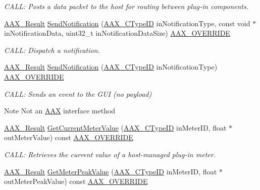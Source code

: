 \begin{DoxyCompactItemize}
\begin{DoxyCompactList}\small\item\em C\+A\+LL\+: Posts a data packet to the host for routing between plug-\/in components. \end{DoxyCompactList}\item 
\mbox{\hyperlink{a00392_a4d8f69a697df7f70c3a8e9b8ee130d2f}{A\+A\+X\+\_\+\+Result}} \mbox{\hyperlink{a01905_aea3105179d5ecba7bb73f5ca1c1cde3e}{Send\+Notification}} (\mbox{\hyperlink{a00392_ac678f9c1fbcc26315d209f71a147a175}{A\+A\+X\+\_\+\+C\+Type\+ID}} in\+Notification\+Type, const void $\ast$in\+Notification\+Data, uint32\+\_\+t in\+Notification\+Data\+Size) \mbox{\hyperlink{a00392_ac2f24a5172689ae684344abdcce55463}{A\+A\+X\+\_\+\+O\+V\+E\+R\+R\+I\+DE}}
\begin{DoxyCompactList}\small\item\em C\+A\+LL\+: Dispatch a notification. \end{DoxyCompactList}\item 
\mbox{\hyperlink{a00392_a4d8f69a697df7f70c3a8e9b8ee130d2f}{A\+A\+X\+\_\+\+Result}} \mbox{\hyperlink{a01905_adec6441f066dd304f04f9ee4d3b041b4}{Send\+Notification}} (\mbox{\hyperlink{a00392_ac678f9c1fbcc26315d209f71a147a175}{A\+A\+X\+\_\+\+C\+Type\+ID}} in\+Notification\+Type) \mbox{\hyperlink{a00392_ac2f24a5172689ae684344abdcce55463}{A\+A\+X\+\_\+\+O\+V\+E\+R\+R\+I\+DE}}
\begin{DoxyCompactList}\small\item\em C\+A\+LL\+: Sends an event to the G\+UI (no payload) \begin{DoxyNote}{Note}
Not an \mbox{\hyperlink{a00852}{A\+AX}} interface method 
\end{DoxyNote}
\end{DoxyCompactList}\item 
\mbox{\hyperlink{a00392_a4d8f69a697df7f70c3a8e9b8ee130d2f}{A\+A\+X\+\_\+\+Result}} \mbox{\hyperlink{a01905_adc873027ab5a8431a96a39497a1f0f0f}{Get\+Current\+Meter\+Value}} (\mbox{\hyperlink{a00392_ac678f9c1fbcc26315d209f71a147a175}{A\+A\+X\+\_\+\+C\+Type\+ID}} in\+Meter\+ID, float $\ast$out\+Meter\+Value) const \mbox{\hyperlink{a00392_ac2f24a5172689ae684344abdcce55463}{A\+A\+X\+\_\+\+O\+V\+E\+R\+R\+I\+DE}}
\begin{DoxyCompactList}\small\item\em C\+A\+LL\+: Retrieves the current value of a host-\/managed plug-\/in meter. \end{DoxyCompactList}\item 
\mbox{\hyperlink{a00392_a4d8f69a697df7f70c3a8e9b8ee130d2f}{A\+A\+X\+\_\+\+Result}} \mbox{\hyperlink{a01905_ab6fb05f502b042b29f8aeaee28f185d1}{Get\+Meter\+Peak\+Value}} (\mbox{\hyperlink{a00392_ac678f9c1fbcc26315d209f71a147a175}{A\+A\+X\+\_\+\+C\+Type\+ID}} in\+Meter\+ID, float $\ast$out\+Meter\+Peak\+Value) const \mbox{\hyperlink{a00392_ac2f24a5172689ae684344abdcce55463}{A\+A\+X\+\_\+\+O\+V\+E\+R\+R\+I\+DE}}

\end{DoxyCompactItemize}
